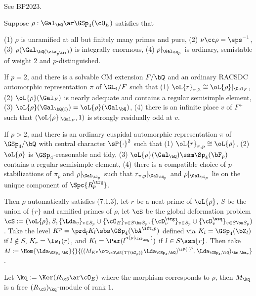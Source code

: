 \documentclass[article, a4paper, twoside]{universal}
\begin{document}
\begin{prf}
    See BP2023.
\end{prf}


\begin{thm}\label{thm:mul1}
    Suppose $\rho:\Gal_{\bQ}\ar\GSp_{4}(\cO_{E})$ satisfies that
    \begin{itm}
        \item (1) $\rho$ is unramified at all but finitely many primes and pure, (2) $\nu\cc\rho=\eps^{-1}$, (3) $\rho(\Gal_{\bQ(\zta_{p^{\ift}})})$ is integrally enormous, (4) $\rho|_{\Gal_{\bQ_{p}}}$ is ordinary, semistable of weight $2$ and $p$-distinguished.
        \item If $p=2$, and there is a solvable CM extension $F/\bQ$ and an ordinary RACSDC automorphic representation $\pi$ of $\GL_{4}/F$ such that (1) $\oL{r}_{\pi,2}\cong\oL{\rho}|_{\Gal_{F}}$, (2) $\oL{\rho}(\Gal_{F})$ is nearly adequate and contains a regular semisimple element, (3) $\oL{\rho}(\Gal_{\bQ(i)})=\oL{\rho}(\Gal_{\bQ})$, (4) there is an infinite place $v$ of $F^{+}$ such that $(\oL{\rho}|_{\Gal_{F}},1)$ is strongly residually odd at $v$.
        \item If $p>2$, and there is an ordinary cuspidal automorphic representation $\pi$ of $\GSp_{4}/\bQ$ with central character $\sP{\cdot}^{2}$ such that (1) $\oL{r}_{\pi,p}\cong\oL{\rho}$, (2) $\oL{\rho}$ is $\GSp_{4}$-reasonable and tidy, (3) $\oL{\rho}(\Gal_{\bQ})\ssm\Sp_{4}(\bF_{p})$ contains a regular semisimple element, (4) there is a compatible choice of $p$-stabilizations of $\pi_{p}$ and $\rho|_{\Gal_{\bQ_{p}}}$ such that $r_{\pi,p}|_{\Gal_{\bQ_{p}}}$ and $\rho|_{\Gal_{\bQ_{p}}}$ lie on the unique component of $\Spc{R_{p}^{\trg}}$.
    \end{itm}
    Then $\rho$ automatically satisfies (7.1.3), let $r$ be a neat prime of $\oL{\rho}$, $S$ be the union of $\{r\}$ and ramified primes of $\rho$, let $\cS$ be the global deformation problem $\cS:=(\oL{\rho},S,\{\Lda_{v}\}_{v\in S_{p}}\cup\{\cO_{E}\}_{v\in S\bs S_{p}},\{\cD_{v}^{\trg}\}_{v\in S_{p}}\cup\{\cD_{v}^{\wsq}\}_{v\in S\bs S_{p}})$. Take the level $K^{p}=\prd_{l}K_{l}\sbs\GSp_{4}(\bA^{\ift,p})$ defined via $K_{l}=\GSp_{4}(\bZ_{l})$ if $l\nin S$, $K_{r}=\Iw_{1}(r)$, and $K_{l}=\Par(l^{a(\rho|_{\Gal_{\bQ_{l}}})})$ if $l\in S\ssm\{r\}$. Then take $M:=\Hom{\Lda_{\GSp_{4},\bQ}}{}{((M_{K^{p}}\ot_{\cO\dS{T(\bZ_{p})}}\Lda_{\GSp_{4},\bQ})^{\sP{\cdot}^{2}},\Lda_{\GSp_{4},\bQ})_{\km,\km_{r}}}$.

    Let $\kq:=\Ker(R_{\cS}\ar\cO_{E})$ where the morphism corresponds to $\rho$, then $M_{\kq}$ is a free $(R_{\cS})_{\kq}$-module of rank $1$.
\end{thm}
\end{document}
